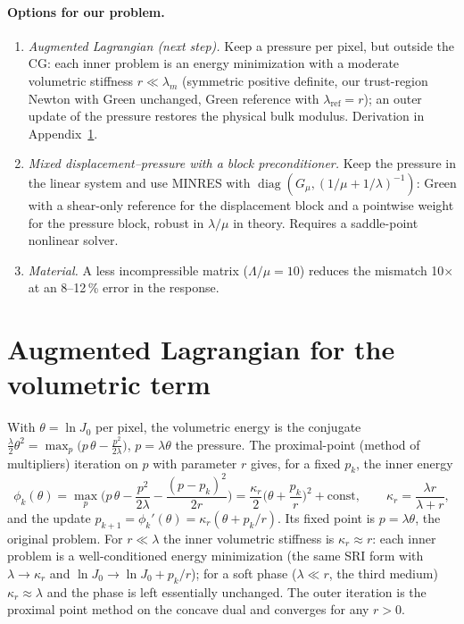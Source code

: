 \documentclass[11pt,a4paper]{article}
\begin{document}
\paragraph{Options for our problem.}
\begin{enumerate}
\item \emph{Augmented Lagrangian (next step).} Keep a pressure per pixel, but outside the CG: each inner problem is
an energy minimization with a moderate volumetric stiffness $r \ll \lambda_m$ (symmetric positive definite, our
trust-region Newton with Green unchanged, Green reference with $\lambda_{\text{ref}} = r$); an outer update of the
pressure restores the physical bulk modulus. Derivation in Appendix~\ref{app:al}.
\item \emph{Mixed displacement--pressure with a block preconditioner.} Keep the pressure in the linear system and use
MINRES with $\operatorname{diag}(G_{\mu}, (1/\mu + 1/\lambda)^{-1})$: Green with a shear-only reference for the
displacement block and a pointwise weight for the pressure block, robust in $\lambda/\mu$ in theory. Requires a
saddle-point nonlinear solver.
\item \emph{Material.} A less incompressible matrix ($\Lambda/\mu = 10$) reduces the mismatch 10$\times$ at an 8--12\,\%
error in the response.
\end{enumerate}

\appendix
\section{Augmented Lagrangian for the volumetric term}
\label{app:al}

With $\theta = \ln J_0$ per pixel, the volumetric energy is the conjugate
$\frac{\lambda}{2}\theta^2 = \max_p \big(p\,\theta - \frac{p^2}{2\lambda}\big)$, $p = \lambda\theta$ the pressure.
The proximal-point (method of multipliers) iteration on $p$ with parameter $r$ gives, for a fixed $p_k$, the inner
energy
\begin{equation}
  \phi_k(\theta) = \max_p \Big( p\,\theta - \frac{p^2}{2\lambda} - \frac{(p - p_k)^2}{2r} \Big)
  = \frac{\kappa_r}{2}\Big(\theta + \frac{p_k}{r}\Big)^2 + \text{const}, \qquad
  \kappa_r = \frac{\lambda r}{\lambda + r},
\end{equation}
and the update $p_{k+1} = \phi_k'(\theta) = \kappa_r(\theta + p_k/r)$. Its fixed point is $p = \lambda\theta$, the
original problem. For $r \ll \lambda$ the inner volumetric stiffness is $\kappa_r \approx r$: each inner problem is a
well-conditioned energy minimization (the same SRI form with $\lambda \to \kappa_r$ and $\ln J_0 \to \ln J_0 + p_k/r$);
for a soft phase ($\lambda \ll r$, the third medium) $\kappa_r \approx \lambda$ and the phase is left essentially
unchanged. The outer iteration is the proximal point method on the concave dual and converges for any $r > 0$.
\end{document}
